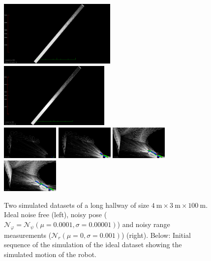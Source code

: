 \begin{figure}
	\includegraphics[width=0.51\textwidth]{images/perfect_top_view}\hfill
	\includegraphics[width=0.48\textwidth]{images/noisy_pose_and_range_top_view}\\\vspace{0.5cm}
	\includegraphics[width=0.25\textwidth]{images/sim_frame_00.png}\hfill
	\includegraphics[width=0.25\textwidth]{images/sim_frame_02.png}\hfill
	\includegraphics[width=0.25\textwidth]{images/sim_frame_06.png}\hfill
	\includegraphics[width=0.25\textwidth]{images/sim_frame_08.png}
	\caption{Two simulated datasets of a long hallway of size $\SI{4}{\meter}\times\SI{3}{\meter}\times\SI{100}{\meter}$. Ideal noise free (left), noisy pose ($\mathcal{N}_\varphi = \mathcal{N}_\psi(\mu = 0.0001, \sigma= 0.00001)$) and noisy range measurements ($\mathcal{N}_r(\mu = 0, \sigma = 0.001)$) (right). Below: Initial sequence of the simulation of the ideal dataset showing the simulated motion of the robot.}
	\label{fig:simulatedDatasets}
\end{figure}
